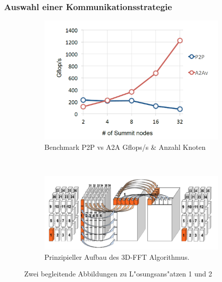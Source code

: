 \subsubsection{Auswahl einer Kommunikationsstrategie}
\begin{figure}
	\begin{subfigure}[t]{0.5\textwidth}
		\centering
		\includegraphics[width=1\textwidth]{res/bench.png}
		\caption{\cite[Abb. 5]{mainpaper} Benchmark P2P vs A2A Gflops/s \& Anzahl Knoten}
		\label{fig:bench}
	\end{subfigure}
~
	\begin{subfigure}[t]{0.5\textwidth}
		\centering
		\includegraphics[width=1\textwidth]{res/algo.png}
		\caption{\cite[Abb. 2]{mainpaper} Prinzipieller Aufbau des 3D-FFT Algorithmus. }
		\label{fig:algo}
	\end{subfigure}
	\caption{Zwei begleitende Abbildungen zu L"osungsans"atzen 1 und 2}
\end{figure}

